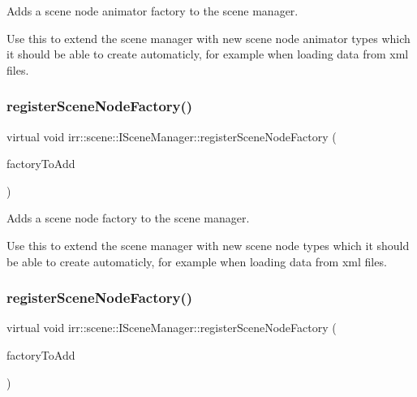 Adds a scene node animator factory to the scene manager. 

Use this to extend the scene manager with new scene node animator types which it should be able to create automaticly, for example when loading data from xml files. \mbox{\label{classirr_1_1scene_1_1ISceneManager_a75ac9315def74ae5e26a2d6a2f5a38e9}} 
\subsubsection{\texorpdfstring{register\+Scene\+Node\+Factory()}{registerSceneNodeFactory()}\hspace{0.1cm}{\footnotesize\ttfamily [1/2]}}
{\footnotesize\ttfamily virtual void irr\+::scene\+::\+I\+Scene\+Manager\+::register\+Scene\+Node\+Factory (\begin{DoxyParamCaption}\item[{\hyperlink{classirr_1_1scene_1_1ISceneNodeFactory}{I\+Scene\+Node\+Factory} $\ast$}]{factory\+To\+Add }\end{DoxyParamCaption})\hspace{0.3cm}{\ttfamily [pure virtual]}}



Adds a scene node factory to the scene manager. 

Use this to extend the scene manager with new scene node types which it should be able to create automaticly, for example when loading data from xml files. \mbox{\label{classirr_1_1scene_1_1ISceneManager_a75ac9315def74ae5e26a2d6a2f5a38e9}} 
\subsubsection{\texorpdfstring{register\+Scene\+Node\+Factory()}{registerSceneNodeFactory()}\hspace{0.1cm}{\footnotesize\ttfamily [2/2]}}
{\footnotesize\ttfamily virtual void irr\+::scene\+::\+I\+Scene\+Manager\+::register\+Scene\+Node\+Factory (\begin{DoxyParamCaption}\item[{\hyperlink{classirr_1_1scene_1_1ISceneNodeFactory}{I\+Scene\+Node\+Factory} $\ast$}]{factory\+To\+Add }\end{DoxyParamCaption})\hspace{0.3cm}{\ttfamily [pure virtual]}}



